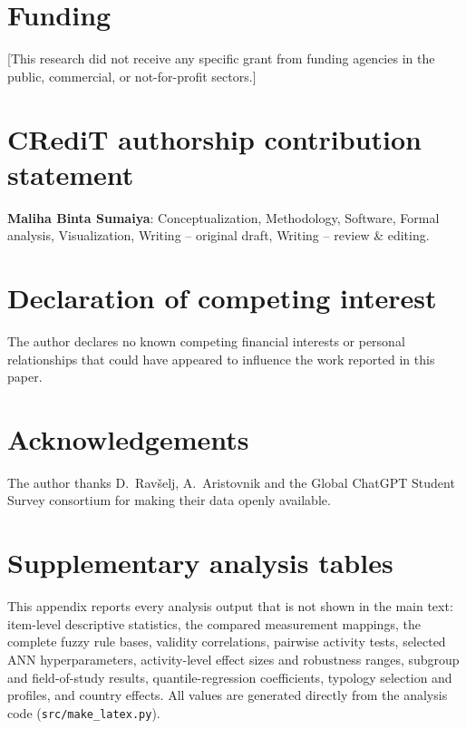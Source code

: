 \documentclass[preprint,12pt,authoryear]{elsarticle}
\theoremstyle{remark}
\begin{document}
\section*{Funding}
[This research did not receive any specific grant from funding agencies in the public, commercial, or not-for-profit sectors.]

\section*{CRediT authorship contribution statement}
\textbf{Maliha Binta Sumaiya}: Conceptualization, Methodology, Software, Formal analysis, Visualization, Writing -- original draft, Writing -- review \& editing.

\section*{Declaration of competing interest}
The author declares no known competing financial interests or personal relationships that could have appeared to influence the work reported in this paper.

\section*{Acknowledgements}
The author thanks D.~Rav\v{s}elj, A.~Aristovnik and the Global ChatGPT Student Survey consortium for making their data openly available.

\appendix
\section{Supplementary analysis tables}
\label{app:tables}
This appendix reports every analysis output that is not shown in the main text: item-level descriptive statistics, the compared measurement mappings, the complete fuzzy rule bases, validity correlations, pairwise activity tests, selected ANN hyperparameters, activity-level effect sizes and robustness ranges, subgroup and field-of-study results, quantile-regression coefficients, typology selection and profiles, and country effects. All values are generated directly from the analysis code (\texttt{src/make\_latex.py}).





\end{document}
